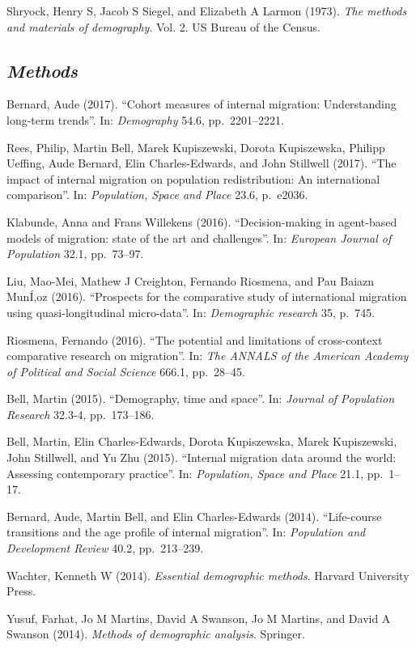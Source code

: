 \documentclass[
  12pt,
]{article}
\begin{document}
Shryock, Henry S, Jacob S Siegel, and Elizabeth A Larmon (1973).
\emph{The methods and materials of demography}. Vol. 2. US Bureau of the
Census.

\hypertarget{methods}{%
\subsection{\texorpdfstring{\emph{Methods}}{Methods}}\label{methods}}

Bernard, Aude (2017). ``Cohort measures of internal migration:
Understanding long-term trends''. In: \emph{Demography} 54.6,
pp.~2201--2221.

Rees, Philip, Martin Bell, Marek Kupiszewski, Dorota Kupiszewska,
Philipp Ueffing, Aude Bernard, Elin Charles-Edwards, and John Stillwell
(2017). ``The impact of internal migration on population redistribution:
An international comparison''. In: \emph{Population, Space and Place}
23.6, p.~e2036.

Klabunde, Anna and Frans Willekens (2016). ``Decision-making in
agent-based models of migration: state of the art and challenges''. In:
\emph{European Journal of Population} 32.1, pp.~73--97.

Liu, Mao-Mei, Mathew J Creighton, Fernando Riosmena, and Pau Baiazn
MunÍ‚oz (2016). ``Prospects for the comparative study of international
migration using quasi-longitudinal micro-data''. In:
\emph{Demographic research} 35, p.~745.

Riosmena, Fernando (2016). ``The potential and limitations of
cross-context comparative research on migration''. In:
\emph{The ANNALS of the American Academy of Political and Social Science}
666.1, pp.~28--45.

Bell, Martin (2015). ``Demography, time and space''. In:
\emph{Journal of Population Research} 32.3-4, pp.~173--186.

Bell, Martin, Elin Charles-Edwards, Dorota Kupiszewska, Marek
Kupiszewski, John Stillwell, and Yu Zhu (2015). ``Internal migration
data around the world: Assessing contemporary practice''. In:
\emph{Population, Space and Place} 21.1, pp.~1--17.

Bernard, Aude, Martin Bell, and Elin Charles-Edwards (2014).
``Life-course transitions and the age profile of internal migration''.
In: \emph{Population and Development Review} 40.2, pp.~213--239.

Wachter, Kenneth W (2014). \emph{Essential demographic methods}. Harvard
University Press.

Yusuf, Farhat, Jo M Martins, David A Swanson, Jo M Martins, and David A
Swanson (2014). \emph{Methods of demographic analysis}. Springer.
\end{document}
